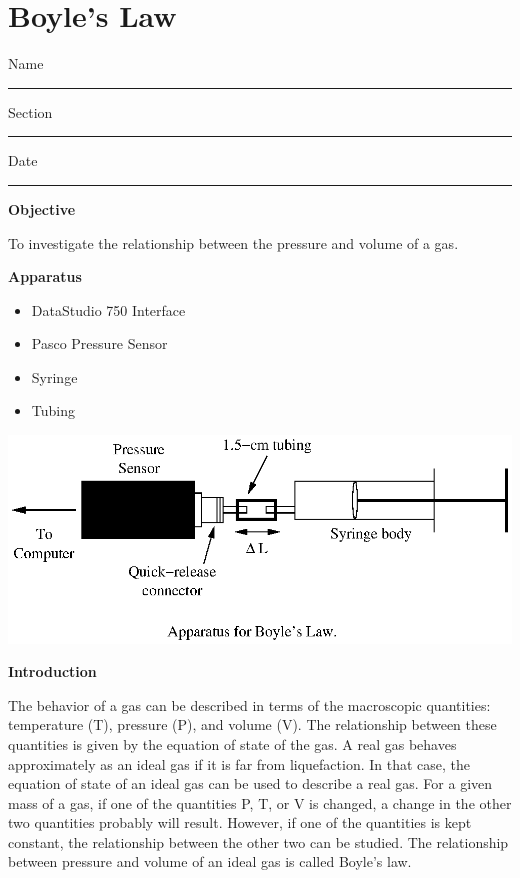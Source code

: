
\section{Boyle's Law}

Name \rule{2.0in}{0.1pt}\hfill{}Section \rule{1.0in}{0.1pt}\hfill{}Date
\rule{1.0in}{0.1pt}

\textbf{Objective}


To investigate the relationship between the pressure and volume of
a gas.

\textbf{Apparatus}

\begin{itemize}
\item DataStudio 750 Interface
\item Pasco Pressure Sensor
\item Syringe
\item Tubing
\end{itemize}
\vspace{0.3cm}
{\par\centering \includegraphics{boyles_law/boyleslawfig1.eps} \par}
\vspace{0.3cm}

\textbf{Introduction}

The behavior of a gas can be described in terms of the macroscopic quantities:
temperature (T), pressure (P), and volume (V). The relationship between these
quantities is given by the equation of state of the gas. A real gas behaves
approximately as an ideal gas if it is far from liquefaction. In that case,
the equation of state of an ideal gas can be used to describe a real gas. For
a given mass of a gas, if one of the quantities P, T, or V is changed, a change
in the other two quantities probably will result. However, if one of the quantities
is kept constant, the relationship between the other two can be studied. The
relationship between pressure and volume of an ideal gas is called Boyle's law.


